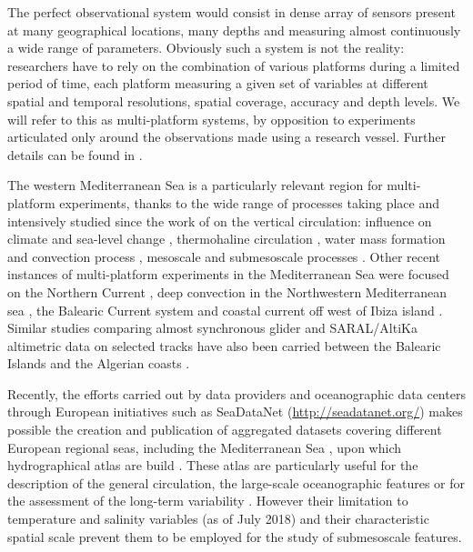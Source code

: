 \documentclass[essd,manuscript]{copernicus}
\begin{document}
The perfect observational system would consist in dense array of sensors present at many geographical locations, many depths and measuring almost continuously a wide range of parameters. Obviously such a system is not the reality: researchers have to rely on the combination of various platforms during a limited period of time, each platform measuring a given set of variables at different spatial and temporal resolutions, spatial coverage, accuracy and depth levels. We will refer to this as multi-platform systems, by opposition to experiments articulated only around the observations made using a research vessel. Further details can be found in \citet{TINTORE13}. 

The western Mediterranean Sea is a particularly relevant region for multi-platform experiments, thanks to the wide range of processes taking place and intensively studied since the work of \cite{WUST61} on the vertical circulation: influence on climate \citep[e.g.,][]{GIORGI06,GIORGI08,ADLOFF15,GUIOT16,RAHMSTORF98} and sea-level change \citep[e.g.,][]{TSIMPLIS02,BONADUCE16,WOLFF18}, thermohaline circulation \citep[e.g.,][]{BERGAMASCO10,MILLOT87,MILLOT91,MILLOT99,SKLIRIS14,ROBINSON01}, water mass formation and convection process \citep[e.g.,][]{MEDOC70,STOMMEL72,SEND1999,MACIAS18}, mesoscale \citep[e.g.,][]{ALVAREZ96,PINOT95,PUJOL05,SANCHEZROMAN17} and submesoscale processes \citep[e.g.,][]{BOSSE15,DAMIEN17,MARGIRIER17,TESTOR03,TESTOR18}. Other recent instances of multi-platform experiments in the Mediterranean Sea were focused on the Northern Current \citep[December 2011,][]{BERTA18}, deep convection in the Northwestern Mediterranean sea \citep[July 2012--October 2013,][]{TESTOR18}, the Balearic Current system \citep[July and November 2007, April and June 2008,][]{BOUFFARD10} and coastal current off west of Ibiza island \citep[August 2013,][]{TROUPIN15}. Similar studies comparing almost synchronous glider and SARAL/AltiKa altimetric data on selected tracks have also been carried between the Balearic Islands and the Algerian coasts \citep{AULICINO18,COTRONEO16}.  

Recently, the efforts carried out by data providers and oceanographic data centers through European initiatives such as SeaDataNet (\url{http://seadatanet.org/}) makes possible the creation and publication of aggregated datasets covering different European regional seas, including the Mediterranean Sea \citep{SIMONCELLI14}, upon which hydrographical atlas are build \citep[e.g.][]{SIMONCELLI16,IONA18a}. These atlas are particularly useful for the description of the general circulation, the large-scale oceanographic features or for the assessment of the long-term variability \citep{IONA18b}. However their limitation to temperature and salinity variables (as of July 2018) and their characteristic spatial scale prevent them to be employed for the study of submesoscale features.
\end{document}
